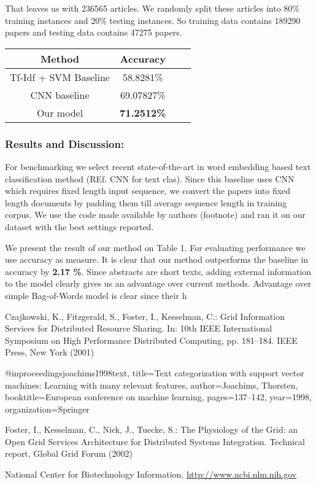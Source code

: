 \documentclass[runningheads,a4paper]{llncs}
\begin{document}
That leaves us with 236565 articles. We randomly split these articles into 80\% training instances and 20\% testing instances. So training data contains 189290 papers and testing data contains 47275 papers.


\begin{center}
\begin{tabular}{ |c|c|c|c| } 
\hline
Method & Accuracy \\
\hline
Tf-Idf + SVM Baseline & 58.8281\% \\ 
\hline
CNN baseline & 69.07827\% \\ 
\hline
Our model & {\bf 71.2512\%} \\
\hline
\end{tabular}
\end{center}

\subsubsection{Results and Discussion:}
For benchmarking we select recent state-of-the-art in word embedding based text classification method (REf. CNN for text clas). Since this baseline uses CNN which requires fixed length input sequence, we convert the papers into fixed length documents by padding them till average sequence length in training corpus. We use the code made available by authors (footnote) and ran it on our dataset with the best settings reported. 

We present the result of our method on Table 1. For evaluating performance we use accuracy as measure. It is clear that our method outperforms the baseline in accuracy by {\bf 2.17 \%}. Since abstracts are short texts, adding external information to the model clearly gives us an advantage over current methods. Advantage over simple Bag-of-Words model is clear since their h




\begin{thebibliography}{4}

 Czajkowski, K., Fitzgerald, S., Foster, I., Kesselman, C.: Grid
Information Services for Distributed Resource Sharing. In: 10th IEEE
International Symposium on High Performance Distributed Computing, pp.
181--184. IEEE Press, New York (2001)

@inproceedings{joachims1998text,
  title={Text categorization with support vector machines: Learning with many relevant features},
  author={Joachims, Thorsten},
  booktitle={European conference on machine learning},
  pages={137--142},
  year={1998},
  organization={Springer}
}


 Foster, I., Kesselman, C., Nick, J., Tuecke, S.: The Physiology of the
Grid: an Open Grid Services Architecture for Distributed Systems
Integration. Technical report, Global Grid Forum (2002)

 National Center for Biotechnology Information, \url{http://www.ncbi.nlm.nih.gov}



\end{thebibliography}
\end{document}
